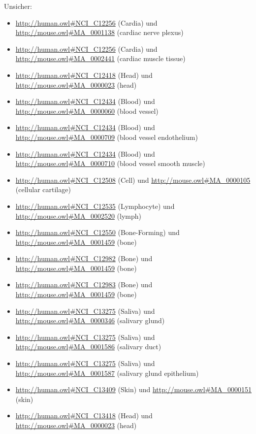 Unsicher:
\begin{itemize}
\item \url{http://human.owl#NCI_C12256} (Cardia) und \url{http://mouse.owl#MA_0001138} (cardiac nerve plexus)
\item \url{http://human.owl#NCI_C12256} (Cardia) und \url{http://mouse.owl#MA_0002441} (cardiac muscle tissue)
\item \url{http://human.owl#NCI_C12418} (Head\textunderscoreund\textunderscoreNeck) und \url{http://mouse.owl#MA_0000023} (head)
\item \url{http://human.owl#NCI_C12434} (Blood) und \url{http://mouse.owl#MA_0000060} (blood vessel)
\item \url{http://human.owl#NCI_C12434} (Blood) und \url{http://mouse.owl#MA_0000709} (blood vessel endothelium)
\item \url{http://human.owl#NCI_C12434} (Blood) und \url{http://mouse.owl#MA_0000710} (blood vessel smooth muscle)
\item \url{http://human.owl#NCI_C12508} (Cell) und \url{http://mouse.owl#MA_0000105} (cellular cartilage)
\item \url{http://human.owl#NCI_C12535} (Lymphocyte) und \url{http://mouse.owl#MA_0002520} (lymph)
\item \url{http://human.owl#NCI_C12550} (Bone\textunderscoreMarrow\textunderscoreBlood-Forming\textunderscoreCell) und \url{http://mouse.owl#MA_0001459} (bone)
\item \url{http://human.owl#NCI_C12982} (Bone\textunderscoreof\textunderscorethe\textunderscoreLower\textunderscoreExtremity) und \url{http://mouse.owl#MA_0001459} (bone)
\item \url{http://human.owl#NCI_C12983} (Bone\textunderscoreof\textunderscorethe\textunderscoreUpper\textunderscoreExtremity) und \url{http://mouse.owl#MA_0001459} (bone)
\item \url{http://human.owl#NCI_C13275} (Saliva) und \url{http://mouse.owl#MA_0000346} (salivary glund)
\item \url{http://human.owl#NCI_C13275} (Saliva) und \url{http://mouse.owl#MA_0001586} (salivary duct)
\item \url{http://human.owl#NCI_C13275} (Saliva) und \url{http://mouse.owl#MA_0001587} (salivary glund epithelium)
\item \url{http://human.owl#NCI_C13409} (Skin\textunderscoreFluid\textunderscoreor\textunderscoreSecretion) und \url{http://mouse.owl#MA_0000151} (skin)
\item \url{http://human.owl#NCI_C13418} (Head\textunderscoreund\textunderscoreNeck\textunderscoreFluids\textunderscoreund\textunderscoreSecretions) und \url{http://mouse.owl#MA_0000023} (head)

\end{itemize}
